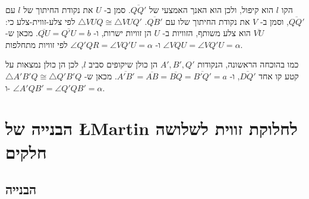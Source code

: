 הקו
$l$
הוא קיפול, ולכן הוא האנך האמצעי של
$\overline{QQ'}$.
סמן ב-%
$U$
את נקודת החיתוך של
$l$
עם
$\overline{QQ'}$,
וסמן ב-%
$V$
את נקודת החיתוך שלו עם
$\overline{QB'}$.
$\triangle VUQ\cong \triangle VUQ'$
לפי צלע-זווית-צלע כי:
$\overline{VU}$
הוא צלע משותף, הזוויות ב-%
$U$
הן זוויות ישרות, ו-%
$\overline{QU}=\overline{Q'U}=b$.
מכאן ש-%
$\angle VQU=\angle VQ'U=\alpha$
ו-%
$\angle Q'QR=\angle VQ'U=\alpha$
לפי זוויות מתחלפות.

כמו בהוכחה הראשונה, הנקודות
$A', B', Q'$
הן כולן שיקופים סביב
$l$,
לכן הן כולן נמצאות על קטע קו אחד
$\overline{DQ'}$,
ו-%
$\overline{A'B'}=\overline{AB}=\overline{BQ}=\overline{B'Q'}=a$.
מכאן ש-%
$\triangle A'B'Q\cong\triangle Q'B'Q$
ו-%
$\angle A'QB'=\angle Q'QB'=\alpha$.


\newpage

\section{הבנייה של
\L{Martin}
לחלוקת זווית לשלושה חלקים%
}\label{s.tri2}

\subsection{הבנייה}

